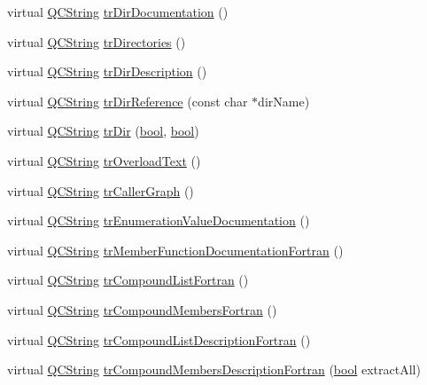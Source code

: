 \begin{DoxyCompactItemize}
\item 
virtual \hyperlink{class_q_c_string}{Q\+C\+String} \hyperlink{class_translator_chinese_afe8633c6f4e696e07e0742aefa455880}{tr\+Dir\+Documentation} ()
\item 
virtual \hyperlink{class_q_c_string}{Q\+C\+String} \hyperlink{class_translator_chinese_a286bf010583e4103b90c6e1b7ad5c8dc}{tr\+Directories} ()
\item 
virtual \hyperlink{class_q_c_string}{Q\+C\+String} \hyperlink{class_translator_chinese_a5fd68cf98e467a72b56c061c0ff78e96}{tr\+Dir\+Description} ()
\item 
virtual \hyperlink{class_q_c_string}{Q\+C\+String} \hyperlink{class_translator_chinese_a082ced768e3f45b78bcff1f1e14c918f}{tr\+Dir\+Reference} (const char $\ast$dir\+Name)
\item 
virtual \hyperlink{class_q_c_string}{Q\+C\+String} \hyperlink{class_translator_chinese_ac39bd93fa1e18ef1949bd9dc43c0257a}{tr\+Dir} (\hyperlink{qglobal_8h_a1062901a7428fdd9c7f180f5e01ea056}{bool}, \hyperlink{qglobal_8h_a1062901a7428fdd9c7f180f5e01ea056}{bool})
\item 
virtual \hyperlink{class_q_c_string}{Q\+C\+String} \hyperlink{class_translator_chinese_a0d0a783cec6284c5ecc2b44099cfbdad}{tr\+Overload\+Text} ()
\item 
virtual \hyperlink{class_q_c_string}{Q\+C\+String} \hyperlink{class_translator_chinese_a327d79d0d375dd73eab9cbbabccb5b56}{tr\+Caller\+Graph} ()
\item 
virtual \hyperlink{class_q_c_string}{Q\+C\+String} \hyperlink{class_translator_chinese_aa01255ece3b24f857760bd23e37b2d93}{tr\+Enumeration\+Value\+Documentation} ()
\item 
virtual \hyperlink{class_q_c_string}{Q\+C\+String} \hyperlink{class_translator_chinese_a9c9313cf216b9915066f5bbde00e8788}{tr\+Member\+Function\+Documentation\+Fortran} ()
\item 
virtual \hyperlink{class_q_c_string}{Q\+C\+String} \hyperlink{class_translator_chinese_a0feb78d3ef47ad9e2685d100ef514fbf}{tr\+Compound\+List\+Fortran} ()
\item 
virtual \hyperlink{class_q_c_string}{Q\+C\+String} \hyperlink{class_translator_chinese_a954fa67b390e237996d34fe6819cd9d5}{tr\+Compound\+Members\+Fortran} ()
\item 
virtual \hyperlink{class_q_c_string}{Q\+C\+String} \hyperlink{class_translator_chinese_aadbc404b206a2fa05a8bdeffbade0d83}{tr\+Compound\+List\+Description\+Fortran} ()
\item 
virtual \hyperlink{class_q_c_string}{Q\+C\+String} \hyperlink{class_translator_chinese_ae8cdfdaeb6152a65560045241010cf51}{tr\+Compound\+Members\+Description\+Fortran} (\hyperlink{qglobal_8h_a1062901a7428fdd9c7f180f5e01ea056}{bool} extract\+All)

\end{DoxyCompactItemize}
